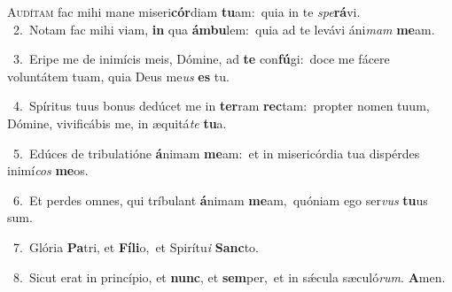 \lettrine{\initial\textcolor{\initialcolor}{A}}{udítam} fac mihi mane miseri\-\textbf{cór}\-diam \textbf{tu}\-am:~\star quia in te \textit{spe}\-\textbf{rá}vi.\\
{\numbfont\textcolor{\numbcolor}{~2.}}~Notam fac mihi viam, \textbf{in} qua \textbf{ám}\-\textbf{bu}lem:~\star quia ad te levávi áni\textit{mam} \textbf{me}\-am.\par
{\numbfont\textcolor{\numbcolor}{~3.}}~Eripe me de inimícis meis, Dómine, ad \textbf{te} con\-\textbf{fú}\-gi:~\star doce me fácere voluntátem tuam, quia Deus me\textit{us} \textbf{es} tu.\par
{\numbfont\textcolor{\numbcolor}{~4.}}~Spíritus tuus bonus dedúcet me in \textbf{ter}\-ram \textbf{rec}\-tam:~\star propter nomen tuum, Dómine, vivificábis me, in æquitá\textit{te} \textbf{tu}\-a.\par
{\numbfont\textcolor{\numbcolor}{~5.}}~Edúces de tribulatióne \textbf{á}\-nimam \textbf{me}\-am:~\star et in misericórdia tua dispérdes inimí\textit{cos} \textbf{me}\-os.\par
{\numbfont\textcolor{\numbcolor}{~6.}}~Et perdes omnes, qui tríbulant \textbf{á}\-nimam \textbf{me}\-am,~\star quóniam ego ser\textit{vus} \textbf{tu}\-us sum.\par
{\numbfont\textcolor{\numbcolor}{~7.}}~Glória \textbf{Pa}\-tri, et \textbf{Fí}\-\textbf{li}o,~\star et Spirítu\textit{i} \textbf{Sanc}\-to.\par
{\numbfont\textcolor{\numbcolor}{~8.}}~Sicut erat in princípio, et \textbf{nunc}\-, et \textbf{sem}\-per,~\star et in sǽcula sæculó\-\textit{rum}\-. \textbf{A}\-men.\par
